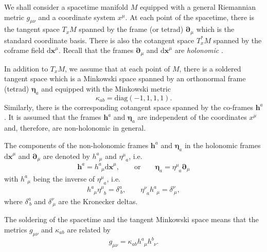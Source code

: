 \documentclass[
10pt, %
a4paper, %
oneside, %
twocolumn,
headinclude,footinclude, %
BCOR5mm, %
]{scrartcl}
\newcommand{\mg}[1]{\kappa_{#1}}			%
\newcommand{\pdd}[1]{{\bm{\partial}_{#1}}}
\newcommand{\dx}[1]{{\bm{\mathrm{d}x}^{#1}}}
\newcommand{\tetrsymbol}{h}
\newcommand{\itetrsymbol}{\eta}
\newcommand{\itetr}[2]{\itetrsymbol^{#1}_{\phantom{#1}#2}}
\newcommand{\tetr}[2]{\tetrsymbol^{#1}_{\phantom{#1}#2}}
\newcommand{\cobas}[1]{\bm{\tetrsymbol}^{#1}}
\newcommand{\bas}[1]{\bm{\itetrsymbol}_{#1}}
\newcommand{\KD}[2]{\delta^{#1}_{\ #2}}
\newcommand{\ho}[1]{\textcolor{magenta}{HO: #1}}
\begin{document}
	We shall consider a spacetime manifold $ M $ equipped with a general Riemannian metric $ 
	g_{\mu\nu} 
	$ and a coordinate system $ x^\mu $. At each 
	point of 
	the spacetime, there is the tangent space $ T_{x}M $ spanned by the frame (or tetrad) $ 
	\pdd{\mu} $ which is the standard coordinate basis. 
	There is also the cotangent space $ T_x^*M $ spanned by the coframe field $ \dx{\mu} $. 
	Recall that the frames $ \pdd{\mu} $ and $ \dx{\mu} $ are \emph{holonomic} 
	\cite{AldrovandiPereiraBook}.
	
	
	In addition to $ T_{x}M $, we assume that at each point of $ M $, there is a soldered tangent 
	space 
	which is a Minkowski space spanned by an orthonormal frame (tetrad) $ \bas{a} $ and equipped 
	with 
	the 
	Minkowski metric 
	\begin{equation}\label{eqn.mg}
		\mg{ab} = \text{diag}(-1,1,1,1).
	\end{equation}
	Similarly, there is the 
	corresponding cotangent space spanned by the co-frames $ \cobas{a} $. It is assumed 
	that the frames $ \cobas{a} $ and $ \bas{a} $ are independent of the coordinates $ x^\mu $ and, 
	therefore, are non-holonomic in general.
	
	The components of the non-holonomic frames $ \cobas{a} $ and $ \bas{a} $ in the holonomic 
	frames $ \dx{\mu} $ and $ \pdd{\mu} $ are denoted by $ \tetr{a}{\mu} $ and $ \itetr{\mu}{a} $, 
	i.e. 
	\begin{equation}
		\cobas{a} = \tetr{a}{\mu}\dx{\mu}, \qquad \text{or} \qquad \bas{a} = \itetr{\mu}{a}\pdd{\mu}
	\end{equation}
	with $ \tetr{a}{\mu} $ being the inverse of $ \itetr{\mu}{a} $, i.e.
	\begin{equation}\label{eqn.inv.tetr}
		\tetr{a}{\mu} \itetr{\mu}{b} = \KD{a}{b},
		\qquad
		\itetr{\nu}{a}\tetr{a}{\mu}  = \KD{\nu}{\mu},
	\end{equation}
	where $ \KD{a}{b} $ and $ \KD{\nu}{\mu} $ are the Kronecker deltas.
	
	The soldering of the spacetime and the tangent Minkowski space means that the metrics $ 
	g_{\mu\nu} 
	$ and $ \mg{ab} $ are related by  
	\begin{equation}
		g_{\mu\nu} = \mg{ab} \tetr{a}{\mu}\tetr{b}{\nu}.
	\end{equation}
	
\end{document}
